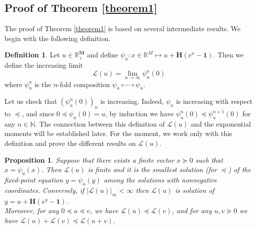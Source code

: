 \documentclass[reqno,final,11pt]{amsart}
\theoremstyle{plain}
\newtheorem{proposition}[theorem]{Proposition}
\theoremstyle{definition}
\newtheorem{definition}[theorem]{Definition}
\theoremstyle{remark}
\newcommand{\R}{\mathds{R}}
\newcommand{\N}{\mathds{N}}
\newcommand{\M}{\bm{M}}
\renewcommand{\L}{\bm{\mathscr{L}}}
\newcommand{\ones}{\bm{1}}
\renewcommand{\H}{\bm{H}}
\newcommand{\pos}{\R_+^{\M}}
\begin{document}
\subsection[Proof of Theorem 1]{Proof of Theorem \ref{theorem1}}\label{section3.2}

The proof of Theorem \ref{theorem1} is based on several intermediate results. We begin with the following definition.

\begin{definition}\label{definition2}
    Let $u\in\pos$ and define $\psi_{u} : x\in\R^M \mapsto u + \H(e^x-\ones)$. Then we define the increasing limit
    \[\L(u) = \lim\limits_{n\to\infty} \psi_u^n(0)\]
    where $\psi^n_u$ is the $n$-fold composition $\psi_u  \circ \cdots \circ \psi_{u}$.
\end{definition}

Let us check that $(\psi_u^n(0))_n$ is increasing. Indeed, $\psi_u$ is increasing with respect to $\preceq$, and since $0\preceq \psi_u(0)=u$, by induction we have $\psi^{n}_u(0) \preceq \psi^{n+1}_u(0)$ for any $n\in\N$. The connection between this definition of $\L(u)$ and the exponential moments will be established later. For the moment, we work only with this definition and prove the different results on $\L(u)$. 

\begin{proposition}\label{proptemp1}
    Suppose that there exists a finite vector $x\succeq0$ such that $x = \psi_{u}(x)$. Then $\L(u)$ is finite and it is the smallest solution (for $\preceq$) of the fixed-point equation $y = \psi_{u}(y)$ among the solutions with nonnegative coordinates. Conversely, if $\vert \L(u)\vert_{\infty} < \infty$ then $\L(u)$ is solution of $y = u+\H(e^y-\ones)$.\\
Moreover, for any $0\preceq u\preceq v$, we have $\L(u) \preceq \L(v)$, and for any $u,v\succeq 0$ we have $\L(u)+\L(v) \preceq \L(u+v)$.
\end{proposition}
\end{document}
